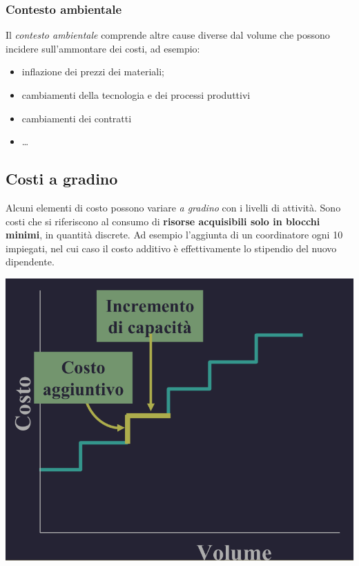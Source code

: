 \documentclass{article}
\begin{document}
\subsubsection{Contesto ambientale}
Il \textit{contesto ambientale} comprende altre cause diverse dal volume che possono incidere sull'ammontare dei costi, ad esempio:
\begin{itemize}
    \item inflazione dei prezzi dei materiali;
    \item cambiamenti della tecnologia e dei processi produttivi
    \item cambiamenti dei contratti
    \item \dots
\end{itemize}


\subsection{Costi a gradino}
Alcuni elementi di costo possono variare \textit{a gradino} con i livelli di attività. Sono costi che si riferiscono al consumo di \textbf{risorse acquisibili solo in blocchi minimi}, in quantità discrete. Ad esempio l'aggiunta di un coordinatore ogni 10 impiegati, nel cui caso il costo additivo è effettivamente lo stipendio del nuovo dipendente.
\begin{center}
    \includegraphics[scale=0.3]{Image/CostiGradino_1.png}
\end{center}
\end{document}
